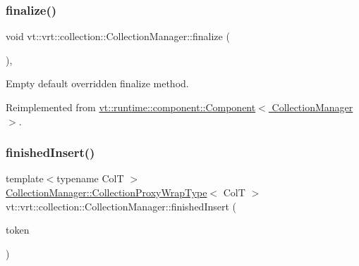 \mbox{\label{structvt_1_1vrt_1_1collection_1_1_collection_manager_afafcdbf36f42835471218b654252031c}} 
\subsubsection{\texorpdfstring{finalize()}{finalize()}}
{\footnotesize\ttfamily void vt\+::vrt\+::collection\+::\+Collection\+Manager\+::finalize (\begin{DoxyParamCaption}{ }\end{DoxyParamCaption})\hspace{0.3cm}{\ttfamily [override]}, {\ttfamily [virtual]}}



Empty default overridden finalize method. 



Reimplemented from \hyperlink{structvt_1_1runtime_1_1component_1_1_component_a098e362de01af6054e5491fba671a959}{vt\+::runtime\+::component\+::\+Component$<$ Collection\+Manager $>$}.

\mbox{\label{structvt_1_1vrt_1_1collection_1_1_collection_manager_a9275a4f6a7c33389813ba7fe4cc75d7e}} 
\subsubsection{\texorpdfstring{finished\+Insert()}{finishedInsert()}}
{\footnotesize\ttfamily template$<$typename ColT $>$ \\
\hyperlink{structvt_1_1vrt_1_1collection_1_1_collection_manager_a56458ed7f9bb22b631b9b3a745f42f94}{Collection\+Manager\+::\+Collection\+Proxy\+Wrap\+Type}$<$ ColT $>$ vt\+::vrt\+::collection\+::\+Collection\+Manager\+::finished\+Insert (\begin{DoxyParamCaption}\item[{\hyperlink{structvt_1_1vrt_1_1collection_1_1_insert_token}{Insert\+Token}$<$ ColT $>$ \&\&}]{token }\end{DoxyParamCaption})}

